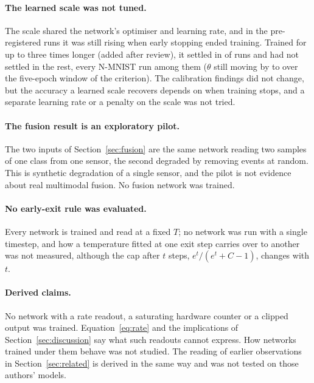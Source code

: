 \documentclass[10pt]{article}
\begin{document}
\paragraph{The learned scale was not tuned.} The scale shared the network's optimiser and learning
rate, and in the pre-registered runs it was still rising when early stopping ended training.
Trained for up to three times longer (added after review), it settled in \aSevenConverged{} of %
\aSevenRuns{} runs and had not settled in the rest, every N-MNIST run among them ($\theta$ still %
moving by \aSevenCapSpanMin{} to \aSevenCapSpanMax{} over the five-epoch window of the criterion). The
calibration findings did not change, but the accuracy a learned scale recovers depends on when
training stops, and a separate learning rate or a penalty on the scale was not tried.

\paragraph{The fusion result is an exploratory pilot.} The two inputs of Section~\ref{sec:fusion}
are the same network reading two samples of one class from one sensor, the second degraded by
removing events at random. This is synthetic degradation of a single sensor, and the pilot is
not evidence about real multimodal fusion. No fusion network was trained.

\paragraph{No early-exit rule was evaluated.} Every network is trained and read at a fixed $T$;
no network was run with a single timestep, and how a temperature fitted at one exit step carries over to another was not
measured, although the cap after $t$ steps, $e^{t}/(e^{t}+C-1)$, changes with $t$.

\paragraph{Derived claims.} No network with a rate readout, a saturating hardware counter or a
clipped output was trained. Equation~\eqref{eq:rate} and the implications of
Section~\ref{sec:discussion} say what such readouts cannot express. How networks trained under
them behave was not studied. The reading of earlier observations in Section~\ref{sec:related} is derived in the
same way and was not tested on those authors' models.
\end{document}
